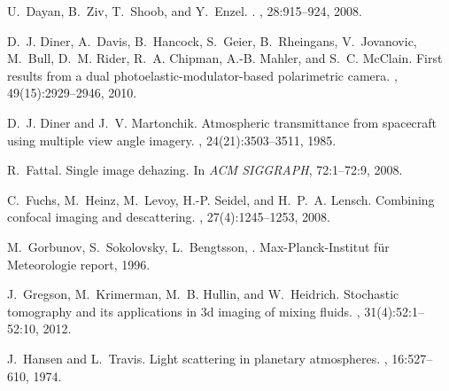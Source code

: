 \documentclass[10pt,twocolumn,letterpaper]{article}
\begin{document}
{\begin{thebibliography}{10}

U.~{Dayan}, B.~{Ziv}, T.~{Shoob}, and Y.~{Enzel}.
.
, 28:915--924, 2008.

D.~J. Diner, A.~Davis, B.~Hancock, S.~Geier, B.~Rheingans, V.~Jovanovic,
  M.~Bull, D.~M. Rider, R.~A. Chipman, A.-B. Mahler, and S.~C. McClain.
\newblock First results from a dual photoelastic-modulator-based polarimetric
  camera.
, 49(15):2929--2946, 2010.


D.~J. Diner and J.~V. Martonchik.
\newblock Atmospheric transmittance from spacecraft using multiple view angle
  imagery.
, 24(21):3503--3511, 1985.

R.~Fattal.
\newblock Single image dehazing.
\newblock In {\em ACM SIGGRAPH}, 72:1--72:9, 2008.

C.~Fuchs, M.~Heinz, M.~Levoy, H.-P. Seidel, and H.~P.~A. Lensch.
\newblock Combining confocal imaging and descattering.
, 27(4):1245--1253, 2008.

M.~Gorbunov, S.~Sokolovsky, L.~Bengtsson, %
.
\newblock Max-Planck-Institut f{\"u}r Meteorologie report, 1996.

J.~Gregson, M.~Krimerman, M.~B. Hullin, and W.~Heidrich.
\newblock Stochastic tomography and its applications in 3d imaging of mixing
  fluids.
, 31(4):52:1--52:10, 2012.

J.~Hansen and L.~Travis.
\newblock Light scattering in planetary atmospheres.
, 16:527--610, 1974.


\end{thebibliography}}
\end{document}
